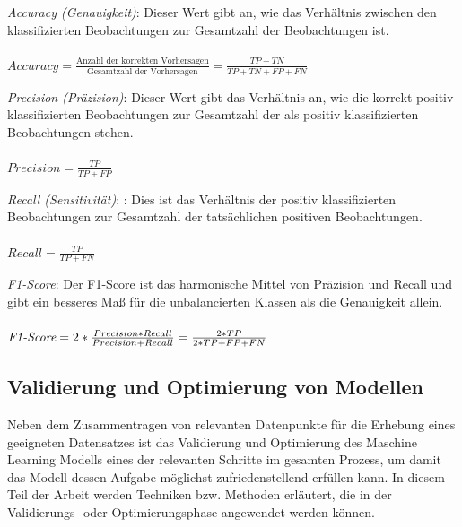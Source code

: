 \begin{description}
    \item \textit{Accuracy (Genauigkeit)}: Dieser Wert gibt an, wie das Verhältnis zwischen den klassifizierten Beobachtungen zur Gesamtzahl der Beobachtungen ist.
    \\
    \\
    $Accuracy = \frac{\text{Anzahl der korrekten Vorhersagen}}{\text{Gesamtzahl der Vorhersagen}} = \frac{TP+TN}{TP+TN+FP+FN}$

    \item \textit{Precision (Präzision)}: Dieser Wert gibt das Verhältnis an, wie die korrekt positiv klassifizierten Beobachtungen zur Gesamtzahl der als positiv klassifizierten Beobachtungen stehen.
    \\
    \\
    $Precision = \frac{TP}{TP+FP}$

    \item \textit{Recall (Sensitivität)}: : Dies ist das Verhältnis der positiv klassifizierten Beobachtungen zur Gesamtzahl der tatsächlichen positiven Beobachtungen.
    \\
    \\
    $Recall = \frac{TP}{TP+FN}$
    
    \item \textit{ F1-Score}: Der F1-Score ist das harmonische Mittel von Präzision und Recall und gibt ein besseres Maß für die unbalancierten Klassen als die Genauigkeit allein.
    \\
    \\
    $\textit{\text{F1-Score}} = 2 * \frac{Precision * Recall}{Precision + Recall} = \frac{2*TP}{2*TP + FP + FN}$
\end{description}

\pagebreak

\subsection{Validierung und Optimierung von Modellen}

Neben dem Zusammentragen von relevanten Datenpunkte für die Erhebung eines geeigneten Datensatzes ist das Validierung und Optimierung des Maschine Learning Modells eines der relevanten Schritte im gesamten Prozess, 
um damit das Modell dessen Aufgabe möglichst zufriedenstellend erfüllen kann. 
In diesem Teil der Arbeit werden Techniken bzw. Methoden erläutert, die in der Validierungs- oder Optimierungsphase angewendet werden können.


